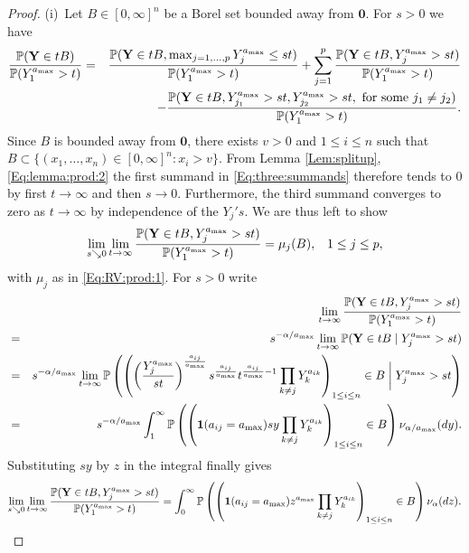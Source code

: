 \begin{proof}%
(i)~Let $B \in [0,\infty]^n$ be a Borel set bounded away from $\mathbf{0}$. For $s>0$ we have
               \begin{eqnarray}
                \label{Eq:three:summands}  \frac{\P(\mathbf{Y} \in tB)}{\P(Y_1^{a_{\max}}>t)} &=&  \frac{\P(\mathbf{Y} \in tB, \max_{j=1, \ldots, p}Y_j^{a_{\max}}\leq st)}{\P(Y_1^{a_{\max}}>t)}
                 + \sum_{j=1}^p  \frac{\P(\mathbf{Y} \in tB, Y_j^{a_{\max}}>st)}{\P(Y_1^{a_{\max}}>t)} \nonumber\\
                && - \frac{\P(\mathbf{Y} \in tB, Y_{j_1}^{a_{\max}}>st, Y_{j_2}^{a_{\max}}>st, \mbox{ for some } j_1 \neq j_2)}{\P(Y_1^{a_{\max}}>t)}.
               \end{eqnarray}
Since $B$ is bounded away from $\mathbf{0}$, there exists $v>0$ and $1 \leq i \leq n$ such that $B \subset \{(x_1, \ldots, x_n) \in [0,\infty]^n: x_i>v\}$. From Lemma \ref{Lem:splitup}, \eqref{Eq:lemma:prod:2} the first summand in \eqref{Eq:three:summands} therefore tends to 0 by first $t \to \infty$ and then $s \to 0$. Furthermore, the third summand converges to zero as $t \to \infty$ by independence of the $Y_j's$. We are thus left to show
$$ \lim_{s \searrow 0}\lim_{t \to \infty} \frac{\P(\mathbf{Y} \in tB, Y_j^{a_{\max}}>st)}{\P(Y_1^{a_{\max}}>t)}=\mu_j(B), \;\;\; 1 \leq j \leq p, $$
with $\mu_j$ as in \eqref{Eq:RV:prod:1}. For $s>0$ write
\begin{eqnarray*} && \lim_{t \to \infty}\frac{\P(\mathbf{Y} \in tB, Y_j^{a_{\max}}>st)}{\P(Y_1^{a_{\max}}>t)}\\
&=& s^{-\alpha/{a_{\max}}} \lim_{t\to \infty} \P(\mathbf{Y} \in tB \mid Y_j^{a_{\max}}>st) \\
&=& s^{-\alpha/{a_{\max}}} \lim_{t \to \infty} \P\left(\left(\left(\frac{Y_j^{a_{\max}}}{st}\right)^{\frac{a_{ij}}{a_{\max}}}s^{\frac{a_{ij}}{a_{\max}}}t^{\frac{a_{ij}}{a_{\max}}-1}\prod_{k\neq j} Y_k^{a_{ik}}\right)_{1\leq i \leq n} \in B \; \bigg| \; Y_j^{a_{\max}}>st \right)\\
&=& s^{-\alpha/{a_{\max}}} \int_1^\infty \P\left(\left(\I(a_{ij}=a_{\max})sy\prod_{k \neq j}Y_k^{a_{ik}}\right)_{1 \leq i \leq n} \in B\right)\nu_{\alpha/a_{\max}}(dy).
\end{eqnarray*}
Substituting $sy$ by $z$ in the integral finally gives
$$ \lim_{s \searrow 0}\lim_{t \to \infty} \frac{\P(\mathbf{Y} \in tB, Y_j^{a_{\max}}>st)}{\P(Y_1^{a_{\max}}>t)}=\int_0^\infty \P\left(\left(\I(a_{ij}=a_{\max})z^{a_{\max}}\prod_{k \neq j}Y_k^{a_{ik}}\right)_{1 \leq i \leq n} \in B\right)\nu_{\alpha}(dz). $$

\end{proof}
